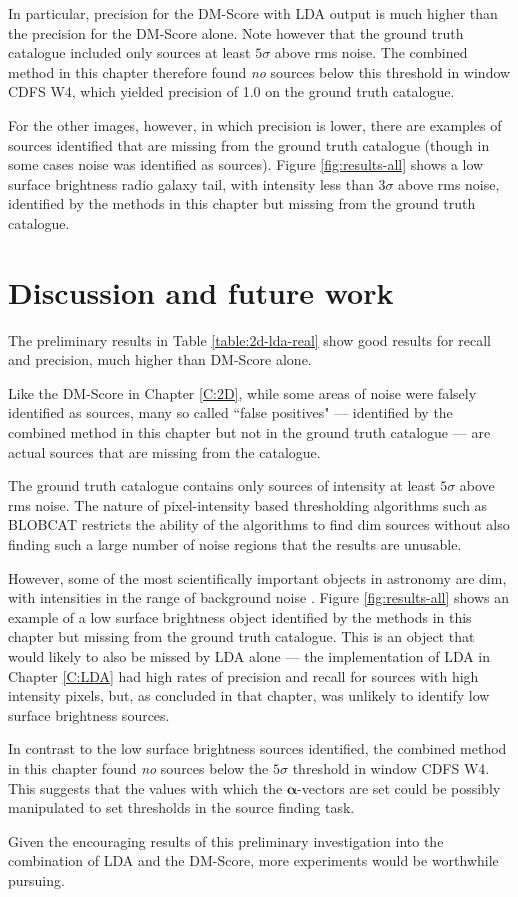 In particular, precision for the DM-Score with LDA output is much higher than the precision for the DM-Score alone. Note however that the ground truth catalogue included only sources at least $5 \sigma$ above rms noise. The combined method in this chapter therefore found \textit{no} sources below this threshold in window CDFS W4, which yielded precision of 1.0 on the ground truth catalogue.

For the other images, however, in which precision is lower, there are examples of sources identified that are missing from the ground truth catalogue (though in some cases noise was identified as sources). Figure \ref{fig:results-all} shows a low surface brightness radio galaxy tail, with intensity less than $3 \sigma$ above rms noise, identified by the methods in this chapter but missing from the ground truth catalogue.

\section{Discussion and future work}
The preliminary results in Table \ref{table:2d-lda-real} show good results for recall and precision, much higher than DM-Score alone. 

Like the DM-Score in Chapter \ref{C:2D}, while some areas of noise were falsely identified as sources, many so called ``false positives" --- identified by the combined method in this chapter but not in the ground truth catalogue --- are actual sources that are missing from the catalogue.

The ground truth catalogue contains only sources of intensity at least $5 \sigma$ above rms noise. The nature of pixel-intensity based thresholding algorithms such as BLOBCAT restricts the ability of the algorithms to find dim sources without also finding such a large number of noise regions that the results are unusable.

However, some of the most scientifically important objects in astronomy are dim, with intensities in the range of background noise \cite{norris2011emu}. Figure \ref{fig:results-all} shows an example of a low surface brightness object identified by the methods in this chapter but missing from the ground truth catalogue. This is an object that would likely to also be missed by LDA alone --- the implementation of LDA in Chapter \ref{C:LDA} had high rates of precision and recall for sources with high intensity pixels, but, as concluded in that chapter, was unlikely to identify low surface brightness sources.

In contrast to the low surface brightness sources identified, the combined method in this chapter found \textit{no} sources below the $5 \sigma$ threshold in window CDFS W4. This suggests that the values with which the $\boldsymbol{\alpha}$-vectors are set could be possibly manipulated to set thresholds in the source finding task.

Given the encouraging results of this preliminary investigation into the combination of LDA and the DM-Score, more experiments would be worthwhile pursuing.
